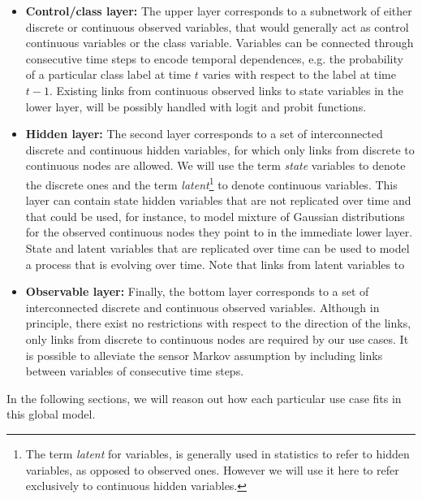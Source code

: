 \begin{itemize}

\item \textbf{Control/class layer:} The upper layer corresponds to a subnetwork of either discrete or continuous observed variables, that would generally act as control continuous variables or the class variable. Variables can be connected through consecutive time steps to encode temporal dependences, e.g. the probability of a particular class label at time $t$ varies with respect to the label at time $t-1$. Existing links from continuous observed links to state variables in the lower layer, will be possibly handled with logit and probit functions.

\item \textbf{Hidden layer:}  The second layer corresponds to a set of interconnected discrete and continuous hidden variables, for which only links from discrete to continuous nodes are allowed. We will use the term \textit{state} variables to denote the discrete ones and the term \textit{latent}\footnote{The term \textit{latent} for variables, is generally used in statistics to refer to hidden variables, as opposed to observed ones. However we will use it here to refer exclusively to continuous hidden variables.} to denote continuous variables. This layer can contain state hidden variables that are not replicated over time and that could be used, for instance, to model mixture of Gaussian distributions for the observed continuous nodes they point to in the immediate lower layer. State and latent variables that are replicated over time can be used to model a process that is evolving over time. Note that links from latent variables to 

\item \textbf{Observable layer:} Finally, the bottom layer corresponds to a set of interconnected discrete and continuous observed variables. Although in principle, there exist no restrictions with respect to the direction of the links, only links from discrete to continuous nodes are required by our use cases. It is possible to alleviate the sensor Markov assumption by including links between variables of consecutive time steps.

\end{itemize} 

In the following sections, we will reason out how each particular use case fits in this global model.


